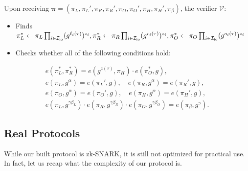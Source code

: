 \documentclass[../../book.tex]{subfiles}
\begin{document}
\begin{tcolorbox}
    Upon receiving $\boldsymbol{\pi} = (\pi_L,\pi_L',\pi_R,\pi_R',\pi_O,\pi_O',\pi_H,\pi_H',\pi_{\beta})$, the verifier $\mathcal{V}$:
    \begin{itemize}[label=]
        \item Finds $\pi_L^* \gets \pi_L\prod_{i \in \mathcal{I}_{\text{io}}} (g^{\ell_i(\tau)})^{z_i},\pi_R^* \gets \pi_R\prod_{i \in \mathcal{I}_{\text{io}}} (g^{r_i(\tau)})^{z_i}, \\
        \pi_O^* \gets \pi_O\prod_{i \in \mathcal{I}_{\text{io}}} (g^{o_i(\tau)})^{z_i}$
        \item Checks whether all of the following conditions hold:
    \end{itemize}
    \begin{align*}
        e(\pi_L^*, \pi_R^*) = e(g^{z(\tau)}, \pi_H) \cdot e(\pi_O^*, g), \\
        e(\pi_L, g^{\alpha}) = e(\pi_L', g), \quad e(\pi_R, g^{\alpha}) = e(\pi_R', g), \\
        e(\pi_O, g^{\alpha}) = e(\pi_O', g), \quad e(\pi_H, g^{\alpha}) = e(\pi_H', g), \\
        e(\pi_L, g^{\gamma\beta_L}) \cdot e(\pi_R, g^{\gamma\beta_R}) \cdot e(\pi_O, g^{\gamma\beta_O}) = e(\pi_{\beta}, g^{\gamma}).
    \end{align*}
\end{tcolorbox}

\subsection{Real Protocols}

While our built protocol is zk-SNARK, it is still not optimized for practical use. In fact, let us recap what the complexity of our protocol is.
\end{document}
